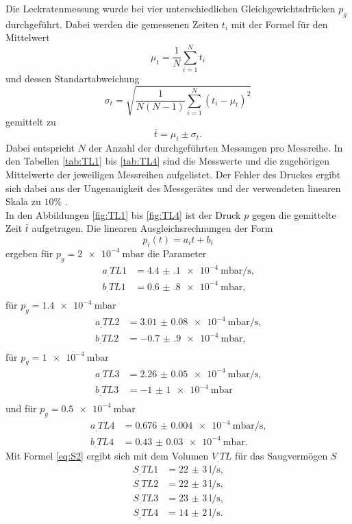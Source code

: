 Die Leckratenmessung wurde bei vier unterschiedlichen Gleichgewichtsdrücken $p_g$ durchgeführt. Dabei werden die gemessenen Zeiten $t_i$ mit der Formel für den Mittelwert
\[
\mu_t = \frac{1}{N}\sum_{i=1}^{N}t_i
\]
und dessen Standartabweichung
\[
\sigma_t = \sqrt{\frac{1}{N(N-1)}\sum_{i=1}^{N}(t_i-\mu_t)^2}
\]
gemittelt zu
\begin{equation}
\bar{t} = \mu_t\pm \sigma_t\text{.} \label{eq:tQuer}
\end{equation} 
Dabei entspricht $N$ der Anzahl der durchgeführten Messungen pro Messreihe.
In den Tabellen \ref{tab:TL1} bis \ref{tab:TL4} sind die Messwerte und die zugehörigen Mittelwerte der jeweiligen Messreihen aufgelistet. Der Fehler des Druckes ergibt sich dabei aus der Ungenauigkeit des Messgerätes und der verwendeten linearen Skala zu $10\%$ \cite{V70}.\\
In den Abbildungen \ref{fig:TL1} bis \ref{fig:TL4} ist der Druck $p$ gegen die gemittelte Zeit $\bar{t}$ aufgetragen.
Die linearen Ausgleichsrechnungen der Form
\[
p_i(t) = a_it+b_i
\]
ergeben für $p_g = \SI{2e-4}{\milli\bar}$ die Parameter
\begin{align*}
a_.{TL1} &= \SI{4.4(1)e-4}{\milli\bar\per\second} \text{,}\\
b_.{TL1} &= \SI{0.6(8)e-4}{\milli\bar} \text{,}\\
\end{align*}
für $p_g = \SI{1.4e-4}{\milli\bar}$
\begin{align*}
a_.{TL2} &= \SI{3.01(8)e-4}{\milli\bar\per\second} \text{,}\\
b_.{TL2} &= \SI{-0.7(9)e-4}{\milli\bar} \text{,}\\
\end{align*}
für $p_g = \SI{1e-4}{\milli\bar}$
\begin{align*}
a_.{TL3} &= \SI{2.26(5)e-4}{\milli\bar\per\second} \text{,}\\
b_.{TL3} &= \SI{-1(1)e-4}{\milli\bar} \\
\end{align*}
und für $p_g = \SI{0.5e-4}{\milli\bar}$
\begin{align*}
a_.{TL4} &= \SI{0.676(4)e-4}{\milli\bar\per\second} \text{,}\\
b_.{TL4} &= \SI{0.43(3)e-4}{\milli\bar} \text{.}
\end{align*}
Mit Formel \eqref{eq:S2} ergibt sich mit dem Volumen $V_.{TL}$ für das Saugvermögen $S$
\begin{align*}
S_.{TL1} &= \SI{22(3)}{\litre\per\second} \text{,}\\
S_.{TL2} &= \SI{22(3)}{\litre\per\second} \text{,}\\
S_.{TL3} &= \SI{23(3)}{\litre\per\second} \text{,}\\
S_.{TL4}   &= \SI{14(2)}{\litre\per\second} \text{.}
\end{align*}

